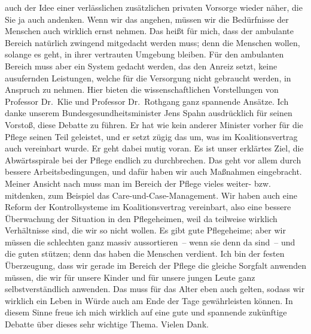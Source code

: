 \documentclass{article}
\begin{document}
auch der Idee einer verlässlichen zusätzlichen privaten Vorsorge wieder näher, die Sie ja auch andenken. Wenn wir das angehen, müssen wir die Bedürfnisse der Menschen auch wirklich ernst nehmen. Das heißt für mich, dass der ambulante Bereich natürlich zwingend mitgedacht werden muss; denn die Menschen wollen, solange es geht, in ihrer vertrauten Umgebung bleiben. Für den ambulanten Bereich muss aber ein System gedacht werden, das den Anreiz setzt, keine ausufernden Leistungen, welche für die Versorgung nicht gebraucht werden, in Anspruch zu nehmen. Hier bieten die wissenschaftlichen Vorstellungen von Professor Dr. Klie und Professor Dr. Rothgang ganz spannende Ansätze.  Ich danke unserem Bundesgesundheitsminister Jens Spahn ausdrücklich für seinen Vorstoß,  diese Debatte zu führen. Er hat wie kein anderer Minister vorher für die Pflege seinen Teil geleistet,  und er setzt zügig das um, was im Koalitionsvertrag auch vereinbart wurde. Er geht dabei mutig voran.  Es ist unser erklärtes Ziel, die Abwärtsspirale bei der Pflege endlich zu durchbrechen. Das geht vor allem durch bessere Arbeitsbedingungen, und dafür haben wir auch Maßnahmen eingebracht. Meiner Ansicht nach muss man im Bereich der Pflege vieles weiter- bzw. mitdenken, zum Beispiel das Care-und-Case-Management. Wir haben auch eine Reform der Kontrollsysteme im Koalitionsvertrag vereinbart, also eine bessere Überwachung der Situation in den Pflegeheimen, weil da teilweise wirklich Verhältnisse sind, die wir so nicht wollen. Es gibt gute Pflegeheime; aber wir müssen die schlechten ganz massiv aussortieren – wenn sie denn da sind – und die guten stützen; denn das haben die Menschen verdient. Ich bin der festen Überzeugung, dass wir gerade im Bereich der Pflege die gleiche Sorgfalt anwenden müssen, die wir für unsere Kinder und für unsere jungen Leute ganz selbstverständlich anwenden. Das muss für das Alter eben auch gelten, sodass wir wirklich ein Leben in Würde auch am Ende der Tage gewährleisten können. In diesem Sinne freue ich mich wirklich auf eine gute und spannende zukünftige Debatte über dieses sehr wichtige Thema. Vielen Dank. 
\end{document}
